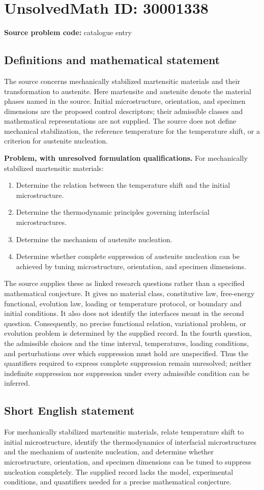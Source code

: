 \documentclass[11pt]{article}
\begin{document}
\section*{UnsolvedMath ID: 30001338}
\textbf{Source problem code:} catalogue entry
\subsection{Definitions and mathematical statement}
The source concerns mechanically stabilized martensitic materials and their transformation to austenite. Here martensite and austenite denote the material phases named in the source. Initial microstructure, orientation, and specimen dimensions are the proposed control descriptors; their admissible classes and mathematical representations are not supplied. The source does not define mechanical stabilization, the reference temperature for the temperature shift, or a criterion for austenite nucleation.

\textbf{Problem, with unresolved formulation qualifications.} For mechanically stabilized martensitic materials:
\begin{enumerate}
\item Determine the relation between the temperature shift and the initial microstructure.
\item Determine the thermodynamic principles governing interfacial microstructures.
\item Determine the mechanism of austenite nucleation.
\item Determine whether complete suppression of austenite nucleation can be achieved by tuning microstructure, orientation, and specimen dimensions.
\end{enumerate}
The source supplies these as linked research questions rather than a specified mathematical conjecture. It gives no material class, constitutive law, free-energy functional, evolution law, loading or temperature protocol, or boundary and initial conditions. It also does not identify the interfaces meant in the second question. Consequently, no precise functional relation, variational problem, or evolution problem is determined by the supplied record. In the fourth question, the admissible choices and the time interval, temperatures, loading conditions, and perturbations over which suppression must hold are unspecified. Thus the quantifiers required to express complete suppression remain unresolved; neither indefinite suppression nor suppression under every admissible condition can be inferred.
\subsection{Short English statement}
For mechanically stabilized martensitic materials, relate temperature shift to initial microstructure, identify the thermodynamics of interfacial microstructures and the mechanism of austenite nucleation, and determine whether microstructure, orientation, and specimen dimensions can be tuned to suppress nucleation completely. The supplied record lacks the model, experimental conditions, and quantifiers needed for a precise mathematical conjecture.
\end{document}
